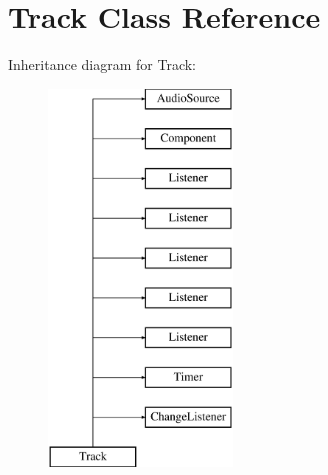 \hypertarget{class_track}{}\section{Track Class Reference}
\label{class_track}
Inheritance diagram for Track\+:\begin{figure}[H]
\begin{center}
\leavevmode
\includegraphics[height=10.000000cm]{class_track}
\end{center}
\end{figure}

